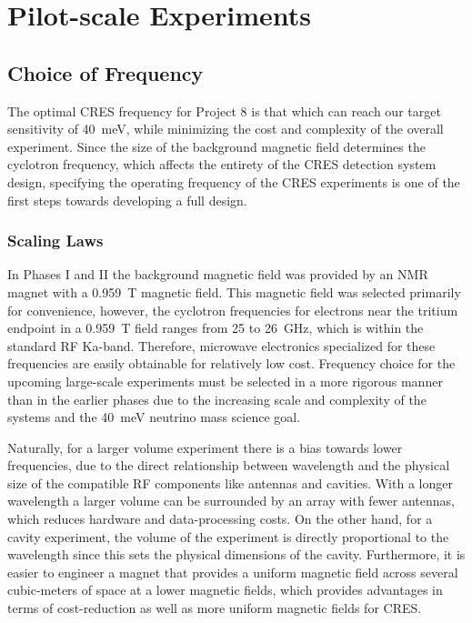 \section{Pilot-scale Experiments}
\label{sec:chap3-freq-choice-and-pilot-scale}

\subsection{Choice of Frequency}
The optimal CRES frequency for Project 8 is that which can reach our target sensitivity of 40~meV, while minimizing the cost and complexity of the overall experiment. Since the size of the background magnetic field determines the cyclotron frequency, which affects the entirety of the CRES detection system design, specifying the operating frequency of the CRES experiments is one of the first steps towards developing a full design.

\subsubsection*{Scaling Laws}

In Phases I and II the background magnetic field was provided by an NMR magnet with a 0.959~T magnetic field. This magnetic field was selected primarily for convenience, however, the cyclotron frequencies for electrons near the tritium endpoint in a 0.959~T field ranges from 25 to 26~GHz, which is within the standard RF Ka-band. Therefore, microwave electronics specialized for these frequencies are easily obtainable for relatively low cost. Frequency choice for the upcoming large-scale experiments must be selected in a more rigorous manner than in the earlier phases due to the increasing scale and complexity of the systems and the 40~meV neutrino mass science goal.

Naturally, for a larger volume experiment there is a bias towards lower frequencies, due to the direct relationship between wavelength and the physical size of the compatible RF components like antennas and cavities. With a longer wavelength a larger volume can be surrounded by an array with fewer antennas, which reduces hardware and data-processing costs. On the other hand, for a cavity experiment, the volume of the experiment is directly proportional to the wavelength since this sets the physical dimensions of the cavity. Furthermore, it is easier to engineer a magnet that provides a uniform magnetic field across several cubic-meters of space at a lower magnetic fields, which provides advantages in terms of cost-reduction as well as more uniform magnetic fields for CRES.

